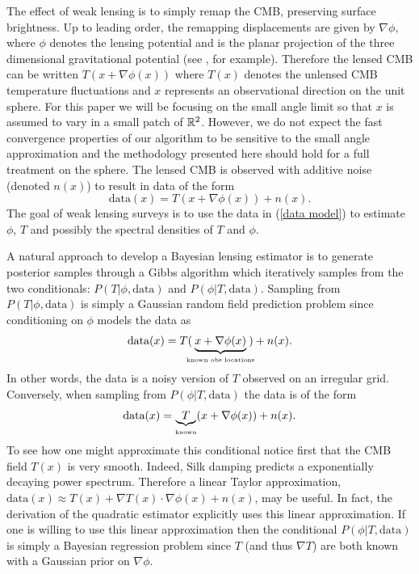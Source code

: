 \documentclass[iop,revtex4,apj,onecolumn]{emulateapj}
\begin{document}
The effect of weak lensing is to simply remap the CMB, preserving surface brightness.   Up to leading order, the remapping  displacements are given by $\nabla \phi$, where $\phi$ denotes the lensing potential and is the planar projection of the three dimensional gravitational potential (see \cite{dodelson2003modern}, for example). Therefore the lensed CMB can  be written $T(x + \nabla \phi(x))$ where $T(x)$ denotes the unlensed CMB temperature fluctuations and $x$ represents an observational direction on the unit sphere. For this paper we will be focusing on the small angle limit  so that $x$ is assumed to vary in a small patch of $ \Bbb R^2$. However, we do not expect the fast convergence properties of our algorithm to be sensitive to the small angle approximation and the methodology presented here should hold for a full treatment on the sphere.  The lensed CMB is observed with additive noise (denoted $n(x)$) to result in data of the form
\begin{equation}
\label{data model}
 \text{data}(x)= T(x + \nabla \phi(x))+ n(x).
\end{equation}
The goal of weak lensing surveys is to use the data in (\ref{data model}) to  estimate $\phi$, $T$  and possibly  the spectral densities of $T$ and $\phi$.  

A natural approach to develop a Bayesian lensing estimator is to generate posterior samples through a Gibbs algorithm which iteratively samples from the two conditionals: $P(T |  \phi,\text{data})$ and $P(\phi | T,  \text{data})$.
Sampling from $P(T |  \phi,\text{data})$ is simply a Gaussian random field prediction problem since conditioning on $\phi$ models the data as
\[
\text{data}(x) = T(\!\!\!\underbrace{x+\nabla\phi(x)}_\text{\tiny known obs locations}\!\!\!) + n(x).
\]
In other words, the data is a noisy version of  $T$ observed on an irregular grid. 
Conversely, when sampling from $P(\phi | T,\text{data})$ the data is of the form
\[
\text{data}(x) = \underbrace{\!\!T\!\!}_{\text{\tiny known}}(x+\nabla\phi(x)) + n(x). 
\]
To see how one might approximate this conditional notice first that the CMB field $T(x)$ is very smooth. Indeed, Silk damping  predicts  a exponentially decaying power spectrum. Therefore a linear Taylor approximation,  $\text{data}(x) \approx T(x) + \nabla T(x)\cdot \nabla\phi(x) + n(x)$, may be useful. In fact, the derivation of the quadratic estimator explicitly uses this linear approximation. 
If one is willing to use this linear approximation then the conditional $P(\phi | T,\text{data})$ is simply a Bayesian regression problem since $T$ (and thus $\nabla T$) are both known with a Gaussian prior on $\nabla \phi$.
\end{document}
